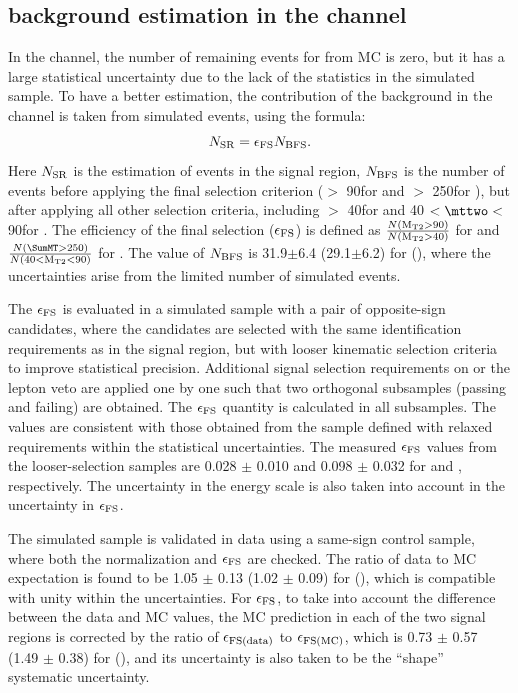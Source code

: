 \subsection{\texorpdfstring{\wjets background estimation in the \tauTau channel}{W+jets background estimation in the tau-tau channel}}
\label{sect:bkgW}
In the \tauTau channel, the number of remaining events for \wjets from MC is zero,
but it has a large statistical uncertainty due to the lack of the statistics in the simulated sample. To
have a better estimation, the contribution of the \wjets background in the \tauTau channel is taken from simulated events, using the formula:
\begin{equation}
N_{\rm SR} = \epsilon_{\rm{FS}}N_{\rm BFS} .
\end{equation}
Here $N_{\rm SR}$ is the estimation of \wjets events in the signal region, $N_{\rm BFS}$ is the number of 
\wjets events before applying the final selection criterion (\mttwo $>$ 90\GeV for \binone and \SumMT $>$ 250\GeV for \bintwo), but after applying all other selection criteria, including \mttwo $>$ 40\GeV for \binone and 40 $<\mttwo<$ 90\GeV for \bintwo.
The efficiency of the final selection ($\epsilon_{\rm{FS}}$) is defined as $\frac{N (\rm M_{T2}>90)}{N (\rm M_{T2}>40)}$ for \binone and $\frac{N (\SumMT>250)}{N(40<\rm M_{T2}<90)}$ for \bintwo.
The value of $N_{\rm BFS}$ is 31.9$\pm$6.4 (29.1$\pm$6.2) for \binone (\bintwo), where the uncertainties arise from the limited number of simulated events. 


The $\epsilon_{\rm{FS}}$ is evaluated in a simulated \wjets sample with a pair of opposite-sign \Tau candidates, where the \Tau candidates 
are selected with the same identification requirements as in the signal region, but with looser kinematic selection criteria to improve statistical precision.
Additional signal selection requirements on \deltaphi or the lepton veto are applied one by one such that two orthogonal subsamples (passing and failing) are obtained. The $\epsilon_{\rm{FS}}$ quantity is calculated in all subsamples. 
The values are consistent with those obtained from the sample defined with relaxed requirements 
within the statistical uncertainties. 
The measured $\epsilon_{\rm{FS}}$ values from the looser-selection samples are  
0.028 $\pm$ 0.010 and 0.098 $\pm$ 0.032 for \binone and \bintwo, respectively.
The uncertainty in the \Tau energy scale is also taken  into account in the uncertainty in $\epsilon_{\rm{FS}}$.


The \wjets simulated sample is validated in data using a same-sign \muTau control sample, where both the normalization and $\epsilon_{\rm{FS}}$ are checked. 
The ratio of data to MC expectation is found to be 1.05 $\pm$ 0.13 (1.02 $\pm$ 0.09) for \binone(\bintwo), 
which is compatible with unity within the uncertainties. 
For $\epsilon_{\rm{FS}}$, to take into account the difference between the data and MC values, 
the MC prediction in each of the two signal regions is corrected by the ratio of $\epsilon_{\rm FS(data)}$ to $\epsilon_{\rm FS(MC)}$, 
which is 0.73 $\pm$ 0.57 (1.49 $\pm$ 0.38) for \binone(\bintwo), and its uncertainty is also taken to be the ``shape'' systematic uncertainty.

